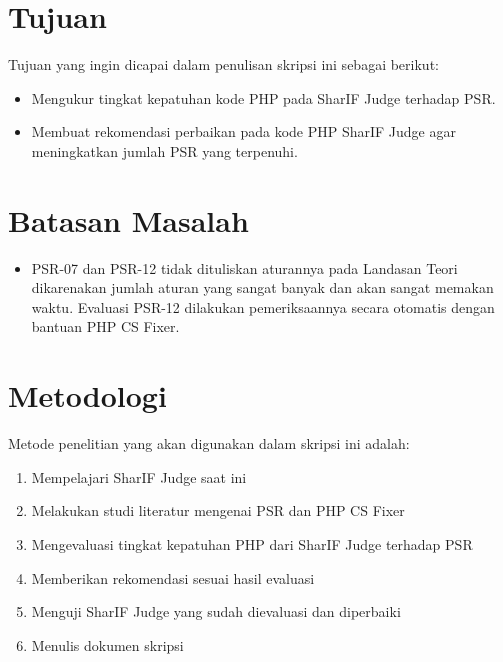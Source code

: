 \section{Tujuan}
\label{sec:tujuan}
Tujuan yang ingin dicapai dalam penulisan skripsi ini sebagai berikut:
\begin{itemize}
	\item Mengukur tingkat kepatuhan kode PHP pada SharIF Judge terhadap PSR.
	\item Membuat rekomendasi perbaikan pada kode PHP SharIF Judge agar meningkatkan jumlah PSR yang terpenuhi. 
\end{itemize}

\section{Batasan Masalah}
\label{sec:batasan}
\begin{itemize}
	\item PSR-07 dan PSR-12 tidak dituliskan aturannya pada Landasan Teori dikarenakan jumlah aturan yang sangat banyak dan akan sangat memakan waktu. Evaluasi PSR-12 dilakukan pemeriksaannya secara otomatis dengan bantuan PHP CS Fixer.
	
\end{itemize}

\section{Metodologi}
\label{sec:metlit}
Metode penelitian yang akan digunakan dalam skripsi ini adalah:
\begin{enumerate}
	\item Mempelajari SharIF Judge saat ini
	\item Melakukan studi literatur mengenai PSR dan PHP CS Fixer
	\item Mengevaluasi tingkat kepatuhan PHP dari SharIF Judge terhadap PSR
	\item Memberikan rekomendasi sesuai hasil evaluasi
	\item Menguji SharIF Judge yang sudah dievaluasi dan diperbaiki
	\item Menulis dokumen skripsi
\end{enumerate}

